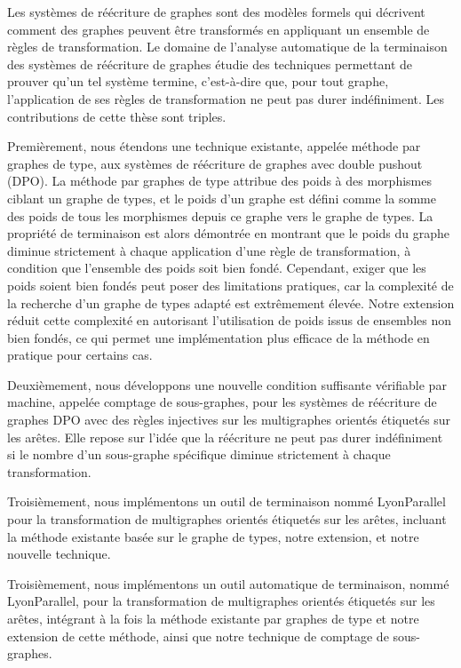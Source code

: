 Les systèmes de réécriture de graphes sont des modèles formels qui décrivent comment des graphes peuvent être transformés en appliquant un ensemble de règles de transformation. Le domaine de l'analyse automatique de la terminaison des systèmes de réécriture de graphes étudie des techniques permettant de prouver qu'un tel système termine, c'est-à-dire que, pour tout graphe, l'application de ses règles de transformation ne peut pas durer indéfiniment. Les contributions de cette thèse sont triples.

Premièrement, nous étendons une technique existante, appelée méthode par graphes de type, aux systèmes de réécriture de graphes avec double pushout (DPO). La méthode par graphes de type attribue des poids à des morphismes ciblant un graphe de types, et le poids d'un graphe est défini comme la somme des poids de tous les morphismes depuis ce graphe vers le graphe de types. La propriété de terminaison est alors démontrée en montrant que le poids du graphe diminue strictement à chaque application d'une règle de transformation, à condition que l'ensemble des poids soit bien fondé. Cependant, exiger que les poids soient bien fondés peut poser des limitations pratiques, car la complexité de la recherche d'un graphe de types adapté est extrêmement élevée. Notre extension réduit cette complexité en autorisant l'utilisation de poids issus de ensembles non bien fondés, ce qui permet une implémentation plus efficace de la méthode en pratique pour certains cas.

Deuxièmement, nous développons une nouvelle condition suffisante vérifiable par machine, appelée comptage de sous-graphes, pour les systèmes de réécriture de graphes DPO avec des règles injectives sur les multigraphes orientés étiquetés sur les arêtes. Elle repose sur l'idée que la réécriture ne peut pas durer indéfiniment si le nombre d'un sous-graphe spécifique diminue strictement à chaque transformation.

Troisièmement, nous implémentons un outil de terminaison nommé LyonParallel pour la transformation de multigraphes orientés étiquetés sur les arêtes, incluant la méthode existante basée sur le graphe de types, notre extension, et notre nouvelle technique.

Troisièmement, nous implémentons un outil automatique de terminaison, nommé LyonParallel, pour la transformation de multigraphes orientés étiquetés sur les arêtes, intégrant à la fois la méthode existante par graphes de type et notre extension de cette méthode, ainsi que notre technique de comptage de sous-graphes.